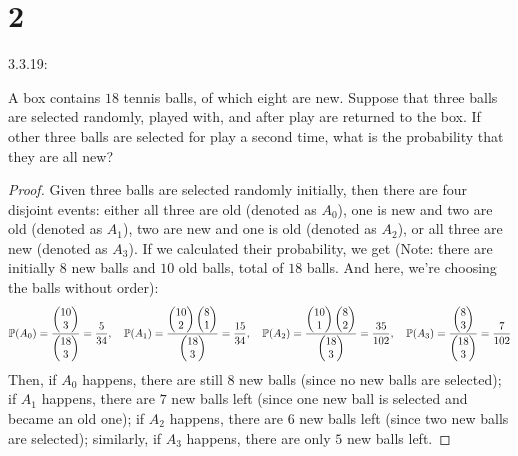 \documentclass{article}
\begin{document}
\newpage

\section*{2}
\begin{ques}\label{q2}
    3.3.19:

    A box contains $18$ tennis balls, of which eight are new. Suppose that three balls are selected randomly, played with, and after play are returned to the box. If other three balls are selected for play a second time, what is the probability that they are all new?
\end{ques}

\begin{proof}
    Given three balls are selected randomly initially, then there are four disjoint events: either all three are old (denoted as $A_0$), one is new and two are old (denoted as $A_1$), two are new and one is old (denoted as $A_2$), or all three are new (denoted as $A_3$). If we calculated their probability, we get (Note: there are initially $8$ new balls and $10$ old balls, total of $18$ balls. And here, we're choosing the balls without order):
    \begin{align}
        \mathbb{P}(A_0)=\frac{\begin{pmatrix}10\\3\end{pmatrix}}{\begin{pmatrix}18\\3\end{pmatrix}}=\frac{5}{34}, \quad \mathbb{P}(A_1)=\frac{\begin{pmatrix}10\\2\end{pmatrix}\begin{pmatrix}8\\1\end{pmatrix}}{\begin{pmatrix}18\\3\end{pmatrix}}=\frac{15}{34}, \quad \mathbb{P}(A_2)=\frac{\begin{pmatrix}10\\1\end{pmatrix}\begin{pmatrix}8\\2\end{pmatrix}}{\begin{pmatrix}18\\3\end{pmatrix}}=\frac{35}{102}, \quad \mathbb{P}(A_3)=\frac{\begin{pmatrix}8\\3\end{pmatrix}}{\begin{pmatrix}18\\3\end{pmatrix}}=\frac{7}{102}
    \end{align}
    Then, if $A_0$ happens, there are still $8$ new balls (since no new balls are selected); if $A_1$ happens, there are $7$ new balls left (since one new ball is selected and became an old one); if $A_2$ happens, there are $6$ new balls left (since two new balls are selected); similarly, if $A_3$ happens, there are only $5$ new balls left.


\end{proof}
\end{document}
